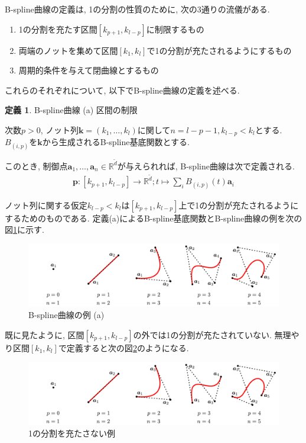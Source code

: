 \documentclass{jsarticle}
\newcommand\setR{\mathbb{R}}
\theoremstyle{definition}%
\newtheorem{defn}[thm]{定義}
\begin{document}
B-spline曲線の定義は, 1の分割の性質のために, 次の3通りの流儀がある.
\begin{enumerate}
    \renewcommand{\labelenumi}{(\alph{enumi})}
    \item 1の分割を充たす区間$[k_{p+1},k_{l-p}]$に制限するもの
    \item 両端のノットを集めて区間$[k_1,k_l]$で1の分割が充たされるようにするもの
    \item 周期的条件を与えて閉曲線とするもの
\end{enumerate}
これらのそれぞれについて, 以下でB-spline曲線の定義を述べる.

\newpage
\begin{screen}
	\begin{defn}
        \label{Def300a}
		B-spline曲線 (a) 区間の制限

        次数$p>0$, ノット列$\bm{k}=(k_1,\dots,k_l)$に関して$n=l-p-1, k_{l-p}<k_{l}$とする.
		$B_{(i,p)}$を$\bm{k}$から生成されるB-spline基底関数とする.

        このとき, 制御点$\bm{a}_1, \dots, \bm{a}_n\in \setR^{\tilde{d}}$が与えられれば, B-spline曲線は次で定義される.
		\begin{align}
			\bm{p}:[k_{p+1},k_{l-p}]\to \setR^{\tilde{d}};t\mapsto\sum_i B_{(i,p)}(t) \bm{a}_i
		\end{align}
	\end{defn}
\end{screen}
ノット列に関する仮定$k_{l-p}<k_{l}$は$[k_{p+1},k_{l-p}]$上で1の分割が充たされるようにするためのものである.
定義(a)によるB-spline基底関数とB-spline曲線の例を次の図\ref{Fig300a}に示す.
\addtocounter{footnote}{-1}
\begin{figure}[htbp]
	\centering
    \includegraphics[page=15,clip,width=160mm]{fig.pdf}
	\caption{B-spline曲線の例 (a)\protect\footnotemark}
	\label{Fig300a}
\end{figure}

既に見たように, 区間$[k_{p+1},k_{l-p}]$の外では1の分割が充たされていない.
無理やり区間$[k_{1},k_{l}]$で定義すると次の図\ref{Fig309}のようになる.

\addtocounter{footnote}{-1}
\begin{figure}[htbp]
	\centering
    \includegraphics[page=15,clip,width=160mm]{fig.pdf}
	\caption{1の分割を充たさない例}
	\label{Fig309}
\end{figure}
\end{document}

